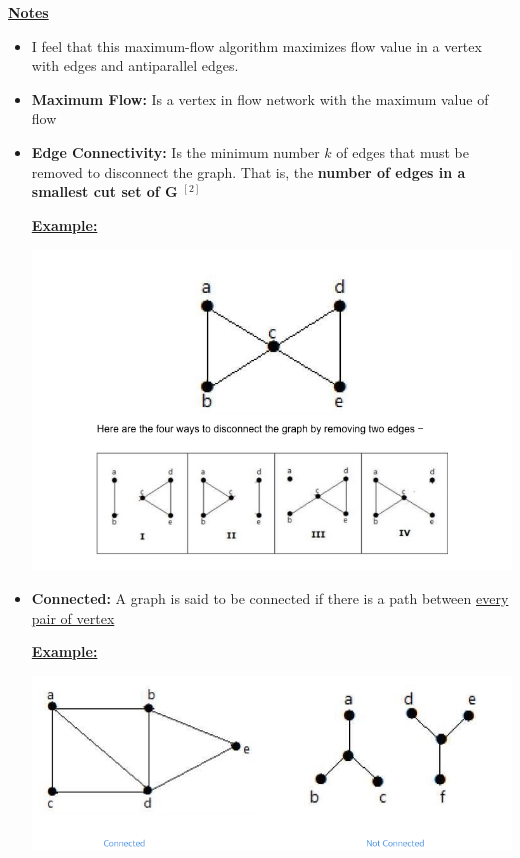 \documentclass[12pt]{article}
\begin{document}
\begin{enumerate}[1.]
\begin{itemize}
    \end{itemize}
    \bigskip

    \underline{\textbf{Notes}}

    \begin{itemize}
        \item I feel that this maximum-flow algorithm maximizes flow value
        in a vertex with edges and antiparallel edges.
        \item \textbf{Maximum Flow:} Is a vertex in flow network with the maximum value of flow


        \item \textbf{Edge Connectivity:} Is the minimum number $k$ of edges
        that must be removed to disconnect the graph. That is, the \textbf{number of edges
        in a smallest cut set of G} $^{[2]}$

        \bigskip

        \underline{\textbf{Example:}}

        \bigskip

        \begin{center}
        \includegraphics[width=\linewidth]{images/worksheet_5_solution_22.png}
        \end{center}

        \item \textbf{Connected:} A graph is said to be connected if there is a path
        between \ul{every pair of vertex}

        \bigskip

        \underline{\textbf{Example:}}

        \bigskip

        \begin{center}
        \includegraphics[width=\linewidth]{images/worksheet_5_solution_21.png}
        \end{center}


\end{itemize}
\end{enumerate}
\end{document}
